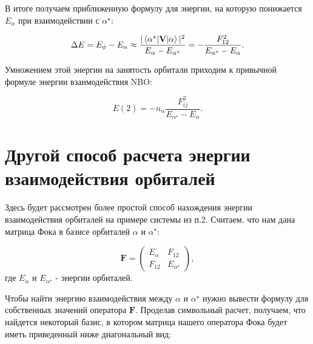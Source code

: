 \documentclass{article}
\begin{document}
В итоге получаем приближенную формулу для энергии, на которую понижается $E_\alpha$ при взаимодействии с $\alpha^\star$:

\begin{equation}
    \Delta E = E_{\phi} - E_{\alpha} \approx \frac{|\braket{\alpha^{\star}|\textbf{V}|\alpha}|^2}{E_{\alpha} - E_{\alpha^{\star}} }
    = -\frac{F_{12}^2}{E_{\alpha^{\star}} - E_{\alpha}}.
    \label{eq:secondorder}
\end{equation}

Умножением этой энергии на занятость орбитали приходим к привычной формуле энергии взаимодействия NBO:

\begin{equation}
    E(2) = - n_{\alpha} \frac{F_{ij}^2}{E_{\alpha^{\star}}-E_{\alpha}}.
\end{equation}

\section{Другой способ расчета энергии взаимодействия орбиталей}

Здесь будет рассмотрен более простой способ нахождения энергии взаимодействия орбиталей на примере системы из п.2. Считаем, что нам дана матрица Фока в базисе орбиталей $\alpha$ и $\alpha^\star$:

\begin{equation}
    \textbf{F} = 
    \begin{pmatrix}
        E_{\alpha} & F_{12} \\
        F_{12} & E_{\alpha^{\star}}
    \end{pmatrix},
\end{equation}
где $E_{\alpha}$ и $E_{\alpha^{\star}}$ - энергии орбиталей.

Чтобы найти энергию взаимодействия между $\alpha$ и $\alpha^\star$ нужно вывести формулу для собственных значений оператора $\textbf{F}$. Проделав символьный расчет,  получаем, что найдется некоторый базис, в котором матрица нашего оператора Фока будет иметь приведенный ниже диагональный вид:
\end{document}
